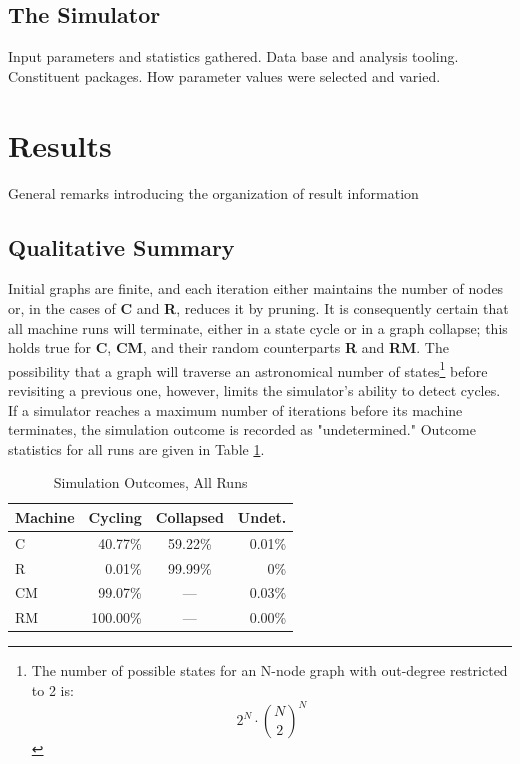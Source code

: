 \documentclass{tufte-handout}
\begin{document}
\subsection{The Simulator}

Input parameters and statistics gathered. Data base and analysis tooling.
Constituent packages. How parameter values were selected and varied.


\section{Results}

General remarks introducing the organization of result information

\subsection{Qualitative Summary}

Initial graphs are finite, and each iteration
either maintains the number of nodes or, in the cases of \textbf{C} and \textbf{R},
reduces it by pruning.  It is consequently certain that all machine runs will terminate,
either in a state cycle or in a graph collapse; this holds true
for \textbf{C}, \textbf{CM}, and their random counterparts \textbf{R} and \textbf{RM}.
The possibility that a graph will traverse an astronomical number
of states\footnote{The number of possible states for an N-node graph with
out-degree restricted to 2 is:
\[
2^N\cdot\binom{N}{2}^N
\]
}
before revisiting a previous one, however, limits the simulator's ability to
detect cycles. If a simulator reaches a maximum number of iterations
before its machine terminates, the simulation outcome is recorded as "undetermined."
Outcome statistics for all runs are given in Table \ref{tab:Tab1}.

\begin{table}
\caption{Simulation Outcomes, All Runs}
\centering
\begin{tabular}{lrcr}
\toprule
Machine & Cycling & Collapsed & Undet. \\
\midrule
C & 40.77\% & 59.22\% & 0.01\% \\
R & 0.01\% & 99.99\% & 0\% \\
\cmidrule(r){2-3}
CM & 99.07\% & --- & 0.03\% \\
RM & 100.00\% & --- & 0.00\% \\
\bottomrule
\end{tabular}
\label{tab:Tab1}
\end{table}
\vspace{3mm}
\end{document}
